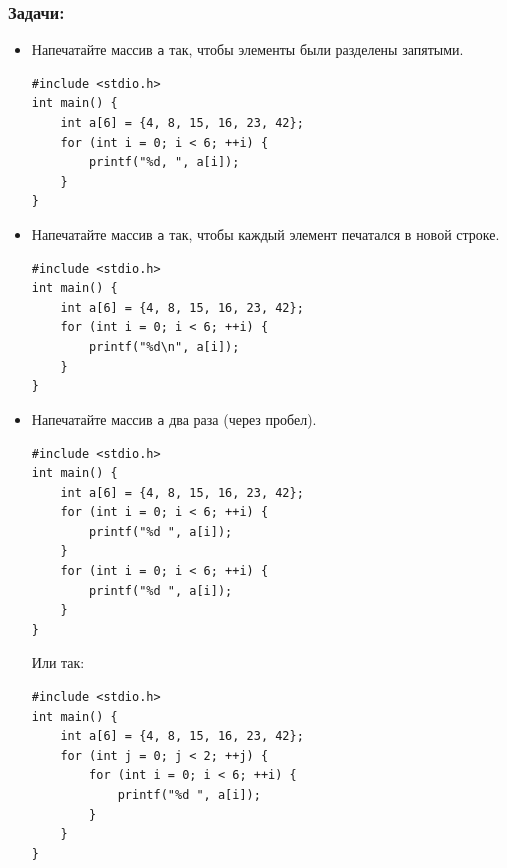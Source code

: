 \documentclass{article}
\begin{document}
\subsubsection*{Задачи:}
\begin{itemize}
\item Напечатайте массив \texttt{a} так, чтобы элементы были разделены запятыми.
\begin{lstlisting}[backgroundcolor = \color{solcolor}]
#include <stdio.h>
int main() {
    int a[6] = {4, 8, 15, 16, 23, 42};
    for (int i = 0; i < 6; ++i) {
        printf("%d, ", a[i]);
    }
}
\end{lstlisting}
\item Напечатайте массив \texttt{a} так, чтобы каждый элемент печатался в новой строке.
\begin{lstlisting}[backgroundcolor = \color{solcolor}]
#include <stdio.h>
int main() {
    int a[6] = {4, 8, 15, 16, 23, 42};
    for (int i = 0; i < 6; ++i) {
        printf("%d\n", a[i]);
    }
}
\end{lstlisting}
\item Напечатайте массив \texttt{a} два раза (через пробел).
\begin{lstlisting}[backgroundcolor = \color{solcolor}]
#include <stdio.h>
int main() {
    int a[6] = {4, 8, 15, 16, 23, 42};
    for (int i = 0; i < 6; ++i) {
        printf("%d ", a[i]);
    }
    for (int i = 0; i < 6; ++i) {
        printf("%d ", a[i]);
    }
}
\end{lstlisting}
Или так:
\begin{lstlisting}[backgroundcolor = \color{solcolor}]
#include <stdio.h>
int main() {
    int a[6] = {4, 8, 15, 16, 23, 42};
    for (int j = 0; j < 2; ++j) {
        for (int i = 0; i < 6; ++i) {
            printf("%d ", a[i]);
        }
    }
}
\end{lstlisting}


\end{itemize}
\end{document}
